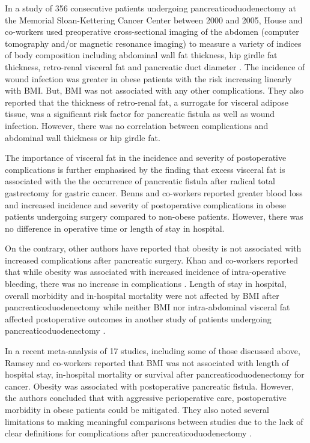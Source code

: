 In a study of 356 consecutive patients undergoing pancreaticoduodenectomy at the Memorial Sloan-Kettering Cancer Center between 2000 and 2005, House and co-workers used preoperative cross-sectional imaging of the abdomen (computer tomography and/or magnetic resonance imaging) to measure a variety of indices of body composition including abdominal wall fat thickness, hip girdle fat thickness, retro-renal visceral fat and pancreatic duct diameter \parencite{house_preoperative_2008}. 
The incidence of wound infection was greater in obese patients with the risk increasing linearly with BMI. 
But, BMI was not associated with any other complications. 
They also reported that the thickness of retro-renal fat, a surrogate for visceral adipose tissue, was a significant risk factor for pancreatic fistula as well as wound infection. 
However, there was no correlation between complications and abdominal wall thickness or hip girdle fat. 

The importance of visceral fat in the incidence and severity of postoperative complications is further emphasised by the finding that excess visceral fat is associated with the the occurrence of pancreatic fistula after radical total gastrectomy for gastric cancer. 
Benns and co-workers reported greater blood loss and increased incidence and severity of postoperative complications in obese patients undergoing surgery compared to non-obese patients. 
However, there was no difference in operative time or length of stay in hospital. \parencite{benns_impact_2009}

On the contrary, other authors have reported that obesity is not associated with increased complications after pancreatic surgery. 
Khan and co-workers reported that while obesity was associated with increased incidence of intra-operative bleeding, there was no increase in complications \parencite{khan_does_2010}. 
Length of stay in hospital, overall morbidity and in-hospital mortality were not affected by BMI after pancreaticoduodenectomy \parencite{tsai_impact_2010} while neither BMI nor intra-abdominal visceral fat affected postoperative outcomes in another study of patients undergoing pancreaticoduodenectomy \parencite{balentine_obesity_2011}.

In a recent meta-analysis of 17 studies, including some of those discussed above, Ramsey and co-workers reported that BMI was not associated with length of hospital stay, in-hospital mortality or survival after pancreaticoduodenectomy for cancer. 
Obesity was associated with postoperative pancreatic fistula. 
However, the authors concluded that with aggressive perioperative care, postoperative morbidity in obese patients could be mitigated. 
They also noted several limitations to making meaningful comparisons between studies due to the lack of clear definitions for complications after pancreaticoduodenectomy \parencite{ramsey_body_2011}.

